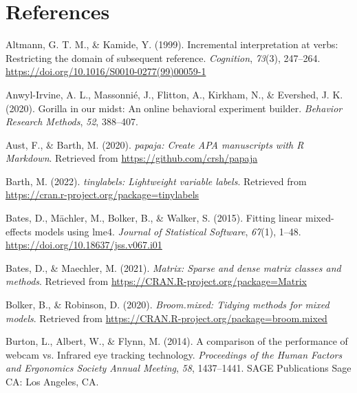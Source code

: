 \documentclass[
  man,floatsintext]{apa6}
\newlength{\cslhangindent}
\newenvironment{CSLReferences}[2] %
 {\begin{list}{}{%
  \setlength{\itemindent}{0pt}
  \setlength{\leftmargin}{0pt}
  \setlength{\parsep}{0pt}
  \ifodd #1
   \setlength{\leftmargin}{\cslhangindent}
   \setlength{\itemindent}{-1\cslhangindent}
  \fi
  \setlength{\itemsep}{#2\baselineskip}}}
 {\end{list}}
\begin{document}
\newpage

\section{References}\label{references}

\begingroup
\setlength{\parindent}{-0.5in}
\setlength{\leftskip}{0.5in}

\label{refs}
\begin{CSLReferences}{1}{0}
Altmann, G. T. M., \& Kamide, Y. (1999). Incremental interpretation at verbs: Restricting the domain of subsequent reference. \emph{Cognition}, \emph{73}(3), 247--264. \url{https://doi.org/10.1016/S0010-0277(99)00059-1}

Anwyl-Irvine, A. L., Massonnié, J., Flitton, A., Kirkham, N., \& Evershed, J. K. (2020). Gorilla in our midst: An online behavioral experiment builder. \emph{Behavior Research Methods}, \emph{52}, 388--407.

Aust, F., \& Barth, M. (2020). \emph{{papaja}: {Create} {APA} manuscripts with {R Markdown}}. Retrieved from \url{https://github.com/crsh/papaja}

Barth, M. (2022). \emph{{tinylabels}: Lightweight variable labels}. Retrieved from \url{https://cran.r-project.org/package=tinylabels}

Bates, D., Mächler, M., Bolker, B., \& Walker, S. (2015). Fitting linear mixed-effects models using {lme4}. \emph{Journal of Statistical Software}, \emph{67}(1), 1--48. \url{https://doi.org/10.18637/jss.v067.i01}

Bates, D., \& Maechler, M. (2021). \emph{Matrix: Sparse and dense matrix classes and methods}. Retrieved from \url{https://CRAN.R-project.org/package=Matrix}

Bolker, B., \& Robinson, D. (2020). \emph{Broom.mixed: Tidying methods for mixed models}. Retrieved from \url{https://CRAN.R-project.org/package=broom.mixed}

Burton, L., Albert, W., \& Flynn, M. (2014). A comparison of the performance of webcam vs. Infrared eye tracking technology. \emph{Proceedings of the Human Factors and Ergonomics Society Annual Meeting}, \emph{58}, 1437--1441. SAGE Publications Sage CA: Los Angeles, CA.


\end{CSLReferences}
\end{document}
